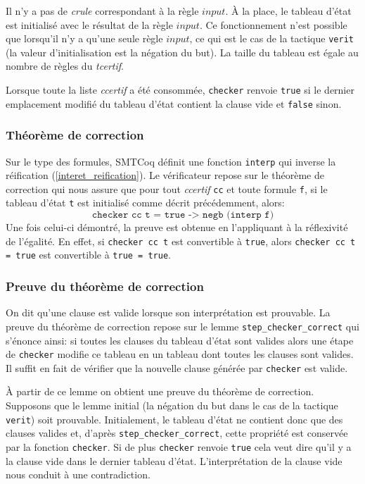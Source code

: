 \documentclass[11pt]{article}
\begin{document}
Il n'y a pas de \textit{crule} correspondant à la règle $input$. À la place, le tableau d'état est initialisé avec le résultat de la règle $input$. Ce fonctionnement n'est possible que lorsqu'il n'y a qu'une seule règle $input$, ce qui est le cas de la tactique \texttt{verit} (la valeur d'initialisation est la négation du but). La taille du tableau est égale au nombre de règles du \textit{tcertif}.\medbreak

Lorsque toute la liste \textit{ccertif} a été consommée, \texttt{checker} renvoie \texttt{true} si le dernier emplacement modifié du tableau d'état contient la clause vide et \texttt{false} sinon.

\subsubsection{Théorème de correction}

Sur le type des formules, SMTCoq définit une fonction \texttt{interp} qui inverse la réification (\ref{interet_reification}). Le vérificateur repose sur le théorème de correction qui nous assure que pour tout \textit{ccertif} \texttt{cc} et toute formule \texttt{f}, si le tableau d'état \texttt{t} est initialisé comme décrit précédemment,  alors: 
\[ \texttt{checker cc t = true -> negb (interp f)} \]
 Une fois celui-ci démontré, la preuve est obtenue en l'appliquant à la réflexivité de l'égalité. En effet, si \texttt{checker cc t} est convertible à \texttt{true}, alors \texttt{checker cc t = true} est convertible à \texttt{true = true}.

\subsubsection{Preuve du théorème de correction} \label{preuve_correction}

On dit qu'une clause est valide lorsque son interprétation est prouvable. La preuve du théorème de correction repose sur le lemme \texttt{step\_checker\_correct} qui s'énonce ainsi: si toutes les clauses du tableau d'état sont valides alors une étape de \texttt{checker} modifie ce tableau en un tableau dont toutes les clauses sont valides. Il suffit en fait de vérifier que la nouvelle clause générée par \texttt{checker} est valide. \medbreak

À partir de ce lemme on obtient une preuve du théorème de correction. Supposons que le lemme initial (la négation du but dans le cas de la tactique \texttt{verit}) soit prouvable. Initialement, le tableau d'état ne contient donc que des clauses valides et, d'après \texttt{step\_checker\_correct}, cette propriété est conservée par la fonction \texttt{checker}. Si de plus \texttt{checker} renvoie \texttt{true} cela veut dire qu'il y a la clause vide dans le dernier tableau d'état. L'interprétation de la clause vide nous conduit à une contradiction.
\end{document}
